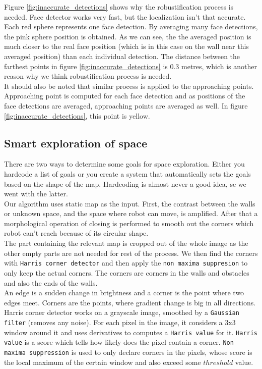 \documentclass[12pt,a4paper]{article}
\begin{document}
	Figure \ref{fig:inaccurate_detections} shows why the robustification process is needed. Face detector works very fast, but the localization isn't that accurate. Each red sphere represents one face detection. By averaging many face detections, the pink sphere position is obtained. As we can see, the the averaged position is much closer to the real face position (which is in this case on the wall near this averaged position) than each individual detection. The distance between the farthest points in figure \ref{fig:inaccurate_detections} is 0.3 metres, which is another reason why we think robustification process is needed. \\
	
	It should also be noted that similar process is applied to the approaching points. Approaching point is computed for each face detection and as positions of the face detections are averaged, approaching points are averaged as well. In figure \ref{fig:inaccurate_detections}, this point is yellow. \\
		
	\subsection{Smart exploration of space} \label{smart_exploration}
	There are two ways to determine some goals for space exploration. Either you hardcode a list of goals or you create a system that automatically sets the goals based on the shape of the map. Hardcoding is almost never a good idea, se we went with the latter. \\

	Our algorithm uses static map as the input. First, the contrast between the walls or unknown space, and the space where robot can move, is amplified. After that a morphological operation of closing is performed to smooth out the corners which robot can't reach because of its circular shape. \\
	
	The part containing the relevant map is cropped out of the whole image as the other empty parts are not needed for rest of the process. We then find the corners with \texttt{Harris corner detector} and then apply the \texttt{non maxima suppresion} to only keep the actual corners. The corners are corners in the walls and obstacles and also the ends of the walls. \\
	
	An edge is a sudden change in brightness and a corner is the point where two edges meet. Corners are the points, where gradient change is big in all directions. Harris corner detector works on a grayscale image, smoothed by a \texttt{Gaussian filter} (removes any noise). For each pixel in the image, it considers a 3x3 window around it and uses derivatives to computes a \texttt{Harris value} for it. \texttt{Harris value} is a score which tells how likely does the pixel contain a corner. \texttt{Non maxima suppression} is used to only declare corners in the pixels, whose score is the local maximum of the certain window and also exceed some $threshold$ value. \\
\end{document}
